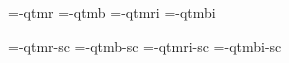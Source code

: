 

\ifx\sizespec\undefined \def\sizespec{}\fi
\ifx\font\corkencoded {}\else {}\fi

\ifx\font\unicoded  {} 
\else

\font\tenrm=\tmp-qtmr  \sizespec
\font\tenbf=\tmp-qtmb  \sizespec
\font\tenit=\tmp-qtmri \sizespec
\font\tenbi=\tmp-qtmbi \sizespec

\font\tenrmc=\tmp-qtmr-sc  \sizespec
\font\tenbfc=\tmp-qtmb-sc  \sizespec
\font\tenitc=\tmp-qtmri-sc \sizespec
\font\tenbic=\tmp-qtmbi-sc \sizespec

\fi

\tenrm

\def\caps#1{{\escapechar=-1 \expandafter}%
  \expandafter\csname\expandafter\tenonlytext\string#1c\endcsname}
\def\tenonlytext{ten}

\ifx\font\corkencoded \else  \fi

\ifx\normalTXmath\undefined  \else\normalTXmath \fi


